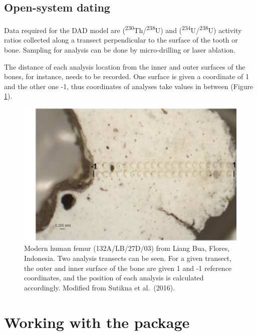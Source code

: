 \documentclass[]{elsarticle} %
\begin{document}
\hypertarget{open-system-dating}{%
\subsection{Open-system dating}\label{open-system-dating}}

Data required for the DAD model are (\textsuperscript{230}Th/\textsuperscript{238}U) and (\textsuperscript{234}U/\textsuperscript{238}U) activity ratios collected along a transect perpendicular to the surface of the tooth or bone. Sampling for analysis can be done by micro-drilling or laser ablation.

The distance of each analysis location from the inner and outer surfaces of the bones, for instance, needs to be recorded. One surface is given a coordinate of 1 and the other one -1, thus coordinates of analyses take values in between (Figure \ref{fig:femurpic}).



\begin{figure}
\includegraphics[width=0.95\linewidth]{figures/bone} \caption{Modern human femur (132A/LB/27D/03) from Liang Bua, Flores, Indonesia. Two analysis transects can be seen. For a given transect, the outer and inner surface of the bone are given 1 and -1 reference coordinates, and the position of each analysis is calculated accordingly. Modified from Sutikna et al.~(2016).}\label{fig:femurpic}
\end{figure}

\FloatBarrier

\hypertarget{working-with-the-package}{%
\section{Working with the package}\label{working-with-the-package}}
\end{document}

